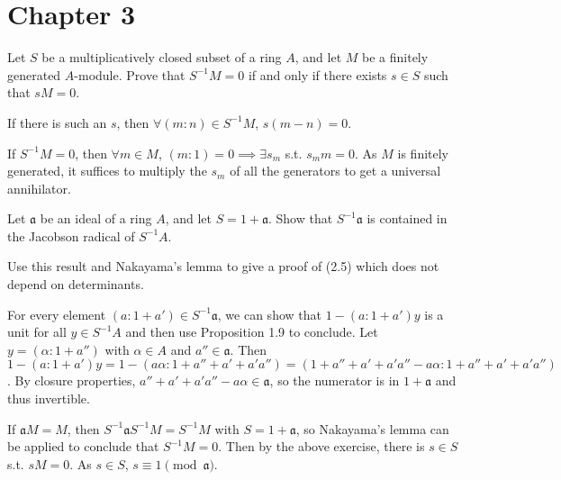 \documentclass[a4paper]{exam}
\newif\ifhint
\begin{document}
\section{Chapter 3}

\begin{questions}
\question Let $S$ be a multiplicatively closed subset of a ring $A $, and let $M$ be a finitely generated $A$-module. Prove that $S^{-1} M = 0$ if and only if there exists $s \in S$ such that $sM = 0$.
\begin{solution}
	If there is such an $s $, then $\forall (m:n) \in S^{-1}M $, $s(m-n) = 0$.

	If $S^{-1}M = 0 $, then $\forall m \in M $, $(m:1) = 0 \implies \exists s_m$ s.t. $s_m m = 0$.
	As $M$ is finitely generated, it suffices to multiply the $s_m$ of all the generators to get a universal annihilator.
\end{solution}

\question Let $\mathfrak{a}$ be an ideal of a ring $A $, and let $S = 1 + \mathfrak{a}$. Show that $S^{-1}\mathfrak{a}$ is contained in the Jacobson radical of $S^{-1}A$.

Use this result and Nakayama's lemma to give a proof of (2.5) which does not depend on determinants.
\ifhint
	If $M = \mathfrak{a}M $, then $S^{-1}M = (S^{-1}\mathfrak{a})(S^{-1}M) $, hence by Nakayama we have $S^{-1}M = 0 $. Now use Exercise 1
\fi
\begin{solution}
	For every element $(a:1+a') \in S^{-1}\mathfrak{a} $, we can show that $1 - (a:1+a')y $ is a unit for all $y\in S^{-1}A $ and then use Proposition 1.9 to conclude.
	Let $y = (\alpha :1+a'') $ with $\alpha  \in A $ and $a'' \in \mathfrak{a} $.
	Then $1 - (a:1+a')y = 1 - (a\alpha :1+a''+a'+a'a'') = (1+a''+a'+a'a'' - a\alpha :1+a''+a'+a'a'') $.
	By closure properties, $a''+a'+a'a''-a\alpha  \in \mathfrak{a} $, so the numerator is in $1+\mathfrak{a} $ and thus invertible.

	If $\mathfrak{a}M = M $, then $S^{-1}\mathfrak{a}S^{-1}M = S^{-1}M $ with $S = 1 + \mathfrak{a} $, so Nakayama's lemma can be applied to conclude that $S^{-1}M = 0 $.
	Then by the above exercise, there is $s \in S $ s.t. $sM = 0 $.
	As $s \in S $, $s \equiv 1\pmod {\mathfrak{a}} $.
\end{solution}


\end{questions}
\end{document}
